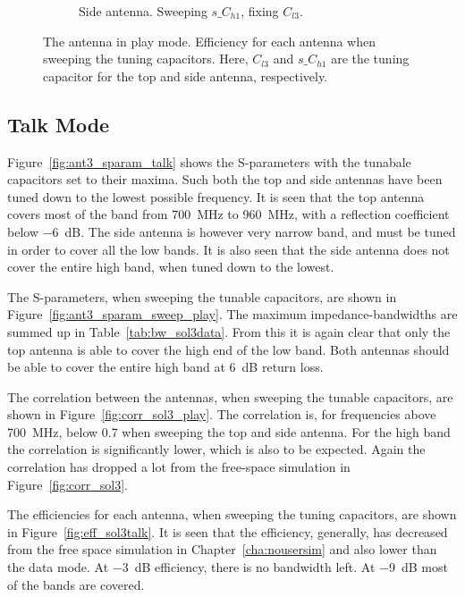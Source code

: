\begin{figure}[htbp]
\begin{subfigure}{0.49\linewidth}
        \caption{Side antenna. Sweeping $s\_C_{h1}$, fixing $C_{l3}$.}
    \end{subfigure}
    \caption{The antenna in play mode. Efficiency for each antenna when sweeping the tuning capacitors. Here, $C_{l3}$ and $s\_C_{h1}$ are the tuning capacitor for the top and side antenna, respectively.}
    \label{fig:eff_sol3play}
\end{figure}

\FloatBarrier
\subsection{Talk Mode}
Figure~\ref{fig:ant3_sparam_talk} shows the S-parameters with the tunabale capacitors set to their maxima. Such both the top and side antennas have been tuned down to the lowest possible frequency. It is seen that the top antenna covers most of the band from \SI{700}{MHz} to \SI{960}{MHz}, with a reflection coefficient below \SI{-6}{dB}. The side antenna is however very narrow band, and must be tuned in order to cover all the low bands. It is also seen that the side antenna does not cover the entire high band, when tuned down to the lowest. 

The S-parameters, when sweeping the tunable capacitors, are shown in Figure~\ref{fig:ant3_sparam_sweep_play}. The maximum impedance-bandwidths are summed up in Table~\ref{tab:bw_sol3data}. From this it is again clear that only the top antenna is able to cover the high end of the low band. Both antennas should be able to cover the entire high band at \SI{6}{dB} return loss.

The correlation between the antennas, when sweeping the tunable capacitors, are shown in Figure~\ref{fig:corr_sol3_play}. The correlation is, for frequencies above \SI{700}{MHz}, below 0.7 when sweeping the top and side antenna. For the high band the correlation is significantly lower, which is also to be expected. Again the correlation has dropped a lot from the free-space simulation in Figure~\ref{fig:corr_sol3}.

The efficiencies for each antenna, when sweeping the tuning capacitors, are shown in Figure~\ref{fig:eff_sol3talk}. It is seen that the efficiency, generally, has decreased from the free space simulation in Chapter~\ref{cha:nousersim} and also lower than the data mode. At \SI{-3}{dB} efficiency, there is no bandwidth left. At \SI{-9}{dB} most of the bands are covered.


